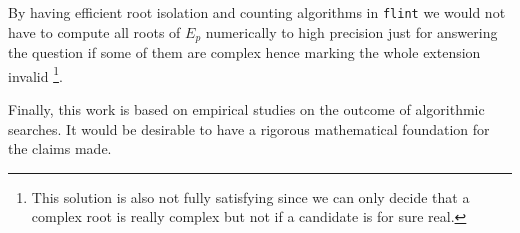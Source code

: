 \documentclass[a4paper,10pt]{article}
\begin{document}
By having efficient root isolation and counting algorithms in \texttt{flint} we would
not have to compute all roots of $E_p$ numerically to high precision just for answering
the question if some of them are complex hence marking the whole extension invalid
\footnote{This solution is also not fully satisfying since we can only
decide that a complex root is really complex but not if a candidate is for sure real.}.

Finally, this work is based on empirical studies on the outcome of algorithmic searches.
It would be desirable to have a rigorous mathematical foundation for the claims made.





\end{document}
